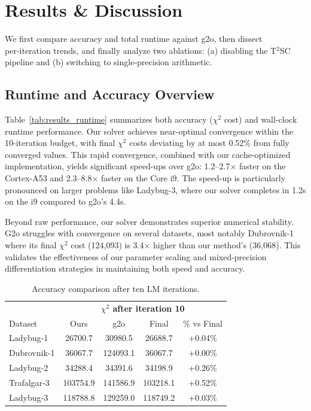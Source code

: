 \section{Results \& Discussion}
\label{sec:results}

We first compare accuracy and total runtime against g2o, then dissect 
per‑iteration trends, and finally analyze two ablations: (a) disabling the T$^{2}$SC 
pipeline and (b) switching to single‑precision arithmetic.

\subsection{Runtime and Accuracy Overview}
\label{subsec:results_runtime}
Table~\ref{tab:results_runtime} summarizes both accuracy ($\chi^{2}$ cost) and wall-clock runtime 
performance. Our solver achieves near-optimal convergence within the 10-iteration budget, with 
final $\chi^{2}$ costs deviating by at most 0.52\% from fully converged values. This rapid 
convergence, combined with our cache-optimized implementation, yields significant speed-ups over 
g2o: 1.2--2.7$\times$ faster on the Cortex-A53 and 2.3--8.8$\times$ faster on the Core i9. The 
speed-up is particularly pronounced on larger problems like Ladybug-3, where our solver completes 
in 1.2s on the i9 compared to g2o's 4.4s.

Beyond raw performance, our solver demonstrates superior numerical stability. G2o struggles with 
convergence on several datasets, most notably Dubrovnik-1 where its final $\chi^{2}$ cost 
(124,093) is 3.4$\times$ higher than our method's (36,068). This validates the effectiveness of 
our parameter scaling and mixed-precision differentiation strategies in maintaining both speed and 
accuracy.

\begin{table}[!htbp]
\caption{Accuracy comparison after ten LM iterations.}
\label{tab:results_accuracy}
\centering
\begin{tabular}{@{}lcccc@{}}
\toprule
& \multicolumn{4}{c}{\textbf{$\chi^{2}$ after iteration 10}} \\
\cmidrule(lr){2-5}
Dataset & Ours & g2o & Final & \% vs Final \\
\midrule
Ladybug‑1   & 26700.7 & 30980.5 & 26688.7 & +0.04\% \\
Dubrovnik‑1 & 36067.7 & 124093.1 & 36067.7 & +0.00\% \\
Ladybug‑2   & 34288.4 & 34391.6 & 34198.9 & +0.26\% \\
Trafalgar‑3 & 103754.9 & 141586.9 & 103218.1 & +0.52\% \\
Ladybug‑3   & 118788.8 & 129259.0 & 118749.2 & +0.03\% \\
\bottomrule
\end{tabular}
\end{table}

